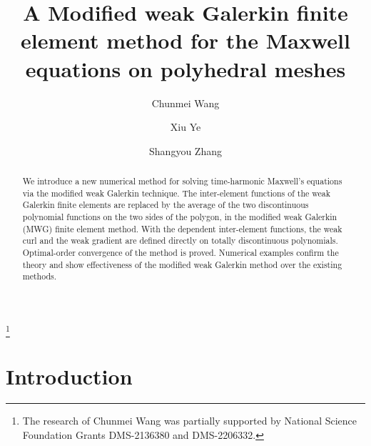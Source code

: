 \documentclass[11pt]{amsart}
\begin{document}
\title[MWG finite element]
{A Modified weak Galerkin finite element method for the Maxwell equations on polyhedral meshes}


\author {Chunmei Wang}
\address{Department of Mathematics, University of Florida, Gainesville, FL 32611, USA. }
\thanks{The research of Chunmei Wang was partially supported by National Science Foundation Grants DMS-2136380 and DMS-2206332.}

\author {Xiu Ye}
\address{Department of Mathematics, University of Arkansas at
Little Rock, Little Rock, AR 72204, USA. }

\author { Shangyou Zhang }
\address{Department of Mathematical
            Sciences, University
     of Delaware, Newark, DE 19716, USA. }

\date{}

\begin{abstract} 
We introduce a new numerical method for solving time-harmonic Maxwell's equations via
 the modified weak Galerkin technique.  The inter-element functions of the weak Galerkin
  finite elements are replaced by the average of the two discontinuous polynomial functions
  on the two sides of the polygon, in the modified weak Galerkin (MWG) finite element method.
With the dependent inter-element functions,
  the weak curl and the weak gradient are defined directly on totally discontinuous
  polynomials. Optimal-order convergence of the method is proved.   Numerical examples
  confirm the theory and show effectiveness of the modified weak Galerkin method over 
  the existing methods.

\end{abstract}


 

\maketitle
\baselineskip=14pt\parskip=5pt

\section{Introduction}
\end{document}
